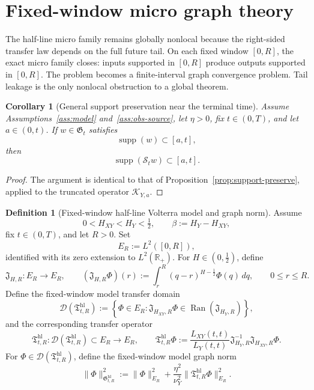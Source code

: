 \documentclass[11pt,a4paper]{amsart}
\theoremstyle{plain}
\newtheorem{corollary}[theorem]{Corollary}
\theoremstyle{definition}
\newtheorem{definition}[theorem]{Definition}
\theoremstyle{remark}
\newcommand{\R}{\mathbb{R}}
\begin{document}
\section{Fixed-window micro graph theory}\label{sec:micro-window}

The half-line micro family remains globally nonlocal because the right-sided transfer law depends
on the full future tail.  On each fixed window \([0,R]\), the exact micro family closes: inputs
supported in \([0,R]\) produce outputs supported in \([0,R]\).  The problem becomes a
finite-interval graph convergence problem.  Tail leakage is the only nonlocal obstruction to a
global theorem.

\begin{corollary}[General support preservation near the terminal time]
\label{cor:general-support-preserve}
Assume Assumptions~\ref{ass:model} and~\ref{ass:obs-source}, let \(\eta>0\), fix \(t\in(0,T)\),
and let \(a\in(0,t)\). If \(w\in\mathfrak G_t\) satisfies
\[
\operatorname{supp}(w)\subset[a,t],
\]
then
\[
\operatorname{supp}(\mathcal S_t w)\subset[a,t].
\]
\end{corollary}

\begin{proof}
The argument is identical to that of Proposition~\ref{prop:support-preserve}, applied to the
truncated operator \(\mathcal K_{Y,a}\).
\end{proof}

\begin{definition}[Fixed-window half-line Volterra model and graph norm]
\label{def:micro-window-model}
Assume
\[
0<H_{XY}<H_Y<\tfrac12,
\qquad
\beta:=H_Y-H_{XY},
\]
fix \(t\in(0,T)\), and let \(R>0\). Set
\[
E_R:=L^2([0,R]),
\]
identified with its zero extension to \(L^2(\R_+)\). For \(H\in(0,\tfrac12)\), define
\[
\mathfrak J_{H,R}:E_R\to E_R,
\qquad
(\mathfrak J_{H,R}\Phi)(r):=\int_r^R (q-r)^{H-\frac12}\Phi(q)\,dq,
\qquad 0\le r\le R.
\]
Define the fixed-window model transfer domain
\[
\mathcal D(\mathfrak T_{t,R}^{\mathrm{hl}})
:=
\left\{
\Phi\in E_R:
\mathfrak J_{H_{XY},R}\Phi\in \operatorname{Ran}(\mathfrak J_{H_Y,R})
\right\},
\]
and the corresponding transfer operator
\[
\mathfrak T_{t,R}^{\mathrm{hl}}:
\mathcal D(\mathfrak T_{t,R}^{\mathrm{hl}})\subset E_R\to E_R,
\qquad
\mathfrak T_{t,R}^{\mathrm{hl}}\Phi
:=
\frac{L_{XY}(t,t)}{L_Y(t,t)}
\mathfrak J_{H_Y,R}^{-1}\mathfrak J_{H_{XY},R}\Phi.
\]
For \(\Phi\in\mathcal D(\mathfrak T_{t,R}^{\mathrm{hl}})\), define the fixed-window model graph norm
\begin{equation}\label{eq:micro-window-model-norm}
\|\Phi\|_{\mathfrak G_{t,R}^{\mathrm{hl}}}^2
:=
\|\Phi\|_{E_R}^2
+\frac{\eta^2}{\nu_Y^2}\|\mathfrak T_{t,R}^{\mathrm{hl}}\Phi\|_{E_R}^2.
\end{equation}
\end{definition}
\end{document}
